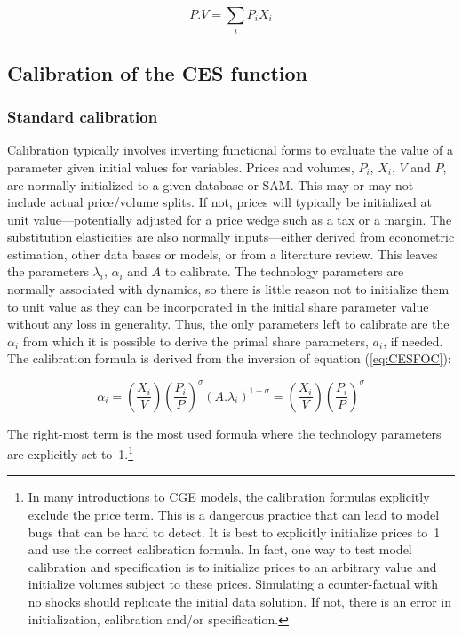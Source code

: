 \begin{displaymath}
P.V=\sum\limits_{i}{{{P}_{i}}{{X}_{i}}}
\end{displaymath}

\subsection{Calibration of the CES function}

\ifCESDetail
\subsubsection{Standard calibration}
\fi

Calibration typically involves inverting functional forms to evaluate the value of a parameter
given initial values for variables. Prices and volumes, $P_i$, $X_i$, $V$ and $P$, are
normally initialized to a given database or SAM. This may or may not include actual
price/volume splits. If not, prices will typically be initialized at unit value---potentially
adjusted for a price wedge such as a tax or a margin. The substitution elasticities are also
normally inputs---either derived from econometric estimation, other data bases or models, or
from a literature review. This leaves the parameters $\lambda_i$, $\alpha_i$ and $A$ to calibrate.
The technology parameters are normally associated with dynamics, so there is little reason not to
initialize them to unit value as they can be incorporated in the initial share parameter value
without any loss in generality. Thus, the only parameters left to calibrate are the $\alpha_i$
from which it is possible to derive the primal share parameters, $a_i$, if needed. The calibration
formula is derived from the inversion of equation (\ref{eq:CESFOC}):

\begin{displaymath}
{{\alpha }_{i}}=\left( \frac{{{X}_{i}}}{V} \right){{\left( \frac{{{P}_{i}}}{P}
\right)}^{\sigma }}{{\left( A.{{\lambda }_{i}} \right)}^{1-\sigma }}=\left(
\frac{{{X}_{i}}}{V} \right){{\left( \frac{{{P}_{i}}}{P} \right)}^{\sigma }}
\end{displaymath}

The right-most term is the most used formula where the technology parameters are explicitly
set to~1.\footnote{In many introductions to CGE models, the calibration formulas
explicitly exclude the price term. This is a dangerous practice that can lead to model bugs
that can be hard to detect. It is best to explicitly initialize prices to~1 and use the correct
calibration formula. In fact, one way to test model calibration and specification is to initialize
prices to an arbitrary value and initialize volumes subject to these prices. Simulating a
counter-factual with no shocks should replicate the initial data solution. If not, there is an
error in initialization, calibration and/or specification.}

